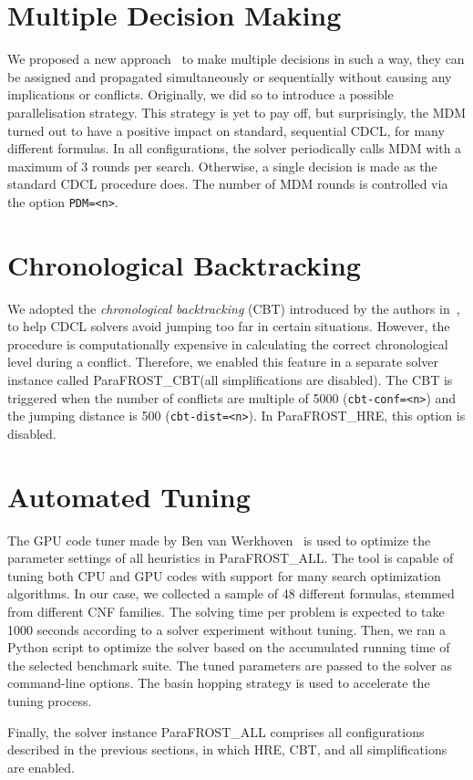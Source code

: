 \documentclass[conference]{IEEEtran}
\newcommand{\parafrostHRE}{ParaFROST\_HRE\xspace}
\newcommand{\parafrostCBT}{ParaFROST\_CBT\xspace}
\newcommand{\parafrostALL}{ParaFROST\_ALL\xspace}
\begin{document}
\section{Multiple Decision Making}
We proposed a new approach~\cite{pdcl} to make multiple decisions in such a way, they can be assigned and propagated simultaneously or sequentially without causing any implications or conflicts. Originally, we did so to introduce a possible parallelisation strategy. This strategy is yet to pay off, but surprisingly, the MDM turned out to have a positive impact on standard, sequential CDCL, for many different formulas. In all configurations, the solver periodically calls MDM with a maximum of 3 rounds per search. Otherwise, a single decision is made as the standard CDCL procedure does. The number of MDM rounds is controlled via the option \texttt{PDM=<n>}. 
%
%
\section{Chronological Backtracking}
We adopted the \emph{chronological backtracking} (CBT) introduced by the authors in~\cite{cbt}, to help CDCL solvers avoid jumping too far in certain situations. However, the procedure is computationally expensive in calculating the correct chronological level during a conflict. Therefore, we enabled this feature in a separate solver instance called \parafrostCBT (all simplifications are disabled). The CBT is triggered when the number of conflicts are multiple of 5000 (\texttt{cbt-conf=<n>}) and the jumping distance is 500 (\texttt{cbt-dist=<n>}). In \parafrostHRE, this option is disabled.
%
%
\section{Automated Tuning}
The GPU code tuner made by Ben van Werkhoven~\cite{tuner,tunerCode} is used to optimize the parameter settings of all heuristics in \parafrostALL. The tool is capable of tuning both CPU and GPU codes with support for many search optimization algorithms. In our case, we collected a sample of 48 different formulas, stemmed from different CNF families. The solving time per problem is expected to take 1000 seconds according to a solver experiment without tuning. Then, we ran a Python script to optimize the solver based on the accumulated running time of the selected benchmark suite. The tuned parameters are passed to the solver as command-line options. The basin hopping strategy is used to accelerate the tuning process.

Finally, the solver instance \parafrostALL comprises all configurations described in the previous sections, in which HRE, CBT, and all simplifications are enabled.



\end{document}
